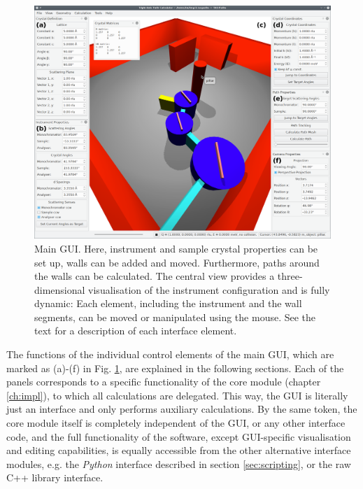 \begin{figure}[htb]
		\begin{center}
			\includegraphics[width = 1 \textwidth]{figures/gui}
		\end{center}
	\caption[Main program GUI.]{Main GUI. 
		Here, instrument and sample crystal properties can be set up,
		walls can be added and moved. 
		Furthermore, paths around the walls can be calculated.
		The central view provides a three-dimensional visualisation of the instrument
		configuration and is fully dynamic: Each element, including the instrument
		and the wall segments, can be moved or manipulated using the mouse.
		See the text for a description of each interface element.
		\label{fig:gui}}
\end{figure}

The functions of the individual control elements of the main GUI, which are marked as (a)-(f)
in Fig. \ref{fig:gui}, are explained in the following sections. Each of the panels corresponds to a specific
functionality of the core module (chapter \ref{ch:impl}), to which all calculations are delegated. 
This way, the GUI is literally just an interface and only performs auxiliary calculations.
By the same token, the core module itself is completely independent of the GUI, or any other
interface code, and the full functionality of the software, except GUI-specific visualisation and editing
capabilities, is equally accessible from the other alternative interface modules, e.g. the \textit{Python}
interface described in section \ref{sec:scripting}, or the raw C++ library interface.



